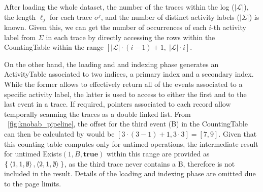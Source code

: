 After loading the whole dataset, the number of the traces within the log ($|\mathcal{L}|$), the length $\ell_j$ for each trace $\sigma^j$, and the number of distinct activity labels ($|\Sigma|$) is known. Given this, we can get the number of occurrences of each $i$-th activity label from $\Sigma$ in each trace by directly accessing the rows within the \textsf{CountingTable} within the range $[|\mathcal{L}|\cdot (i-1) + 1,\; |\mathcal{L}|\cdot i]$.


On the other hand, the loading and and indexing phase generates an \textsf{ActivityTable} associated to two indices, a primary index and a secondary index. While the former allows to effectively return all of the events associated to a specific activity label, the latter is used to access to either the first and to the last event in a trace. If required, pointers associated to each record allow temporally scanning the traces as a double linked list. From \figurename~\ref{fig:knobab_pipeline}, the offset for the third event (B) in the \textsf{CountingTable} can then be calculated by would be $[3 \cdot (3-1) + 1, 3 \cdot 3] = [7,9]$. Given that this counting table computes only for untimed operations, the intermediate result for untimed \textsf{Exists}$(1,B,\textbf{true})$ within this range are provided as $\Set{\braket{1,1,\emptyset}, \braket{2,1,\emptyset}}$, as the third trace never contains a B, therefore is not included in the result.
Details of the loading and indexing phase are omitted due to the page limits.



